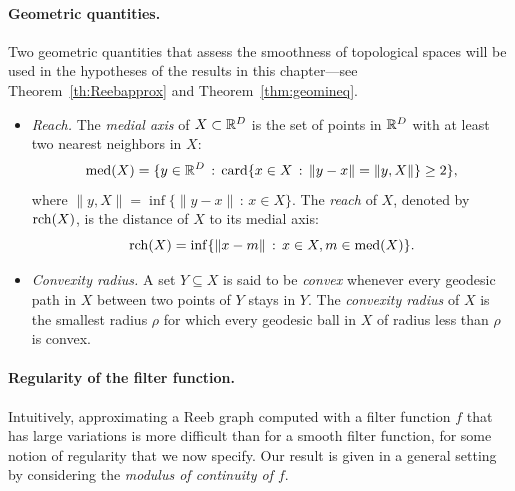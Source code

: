 \paragraph*{Geometric quantities.} Two geometric quantities that assess the smoothness of topological spaces
will be used in the hypotheses of the results in this chapter---see Theorem~\ref{th:Reebapprox} and Theorem~\ref{thm:geomineq}.
\begin{itemize}

\item {\em Reach.} The {\em medial axis} of $X\subset \mathbb{R}^D$ is the set of points in $\mathbb{R}^D$ with at least two nearest neighbors in $X$:
$${\rm med}(X)=\{y\in\mathbb{R}^D\,:\,{\rm card}\{x\in X\,:\,\|y-x\|=\|y,X\|\} \geq 2\},$$
where $\|y,X\|=\inf\{\|y-x\|\,:\,x\in X\}$.
The {\em reach} of $X$, denoted by ${\rm rch}(X)$, is the distance of $X$ to its medial axis:
$${\rm rch}(X)=\inf\{\|x-m\|\,:\,x\in X,m\in{\rm med}(X)\}.$$

\item {\em Convexity radius.} A set $Y\subseteq X$ is said to be {\em convex} whenever every
geodesic path in $X$ between two points of $Y$ stays in $Y$. The {\em convexity radius} of $X$
is the smallest radius $\rho$ for which every geodesic ball in $X$ of radius less than $\rho$
is convex. 

\end{itemize}

\paragraph*{Regularity of the filter function.}
Intuitively, approximating  a Reeb graph computed with a filter function $f$ that has large variations is more difficult 
than for a smooth filter function, for some notion of regularity that we now specify. 
Our result is given in a general setting by considering the {\em modulus of continuity of $f$}. 

